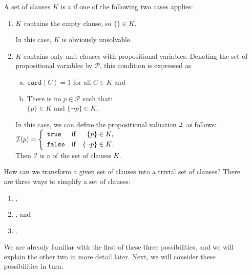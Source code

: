 \begin{Definition}
  A set of clauses $K$ is a  if one of the following two cases applies:
  \begin{enumerate}
  \item $K$ contains the empty clause, so $\{\} \in K$.

        In this case, $K$ is obviously unsolvable.
  \item $K$ contains only unit clauses with \underline{} propositional variables.
        Denoting the set of propositional variables by $\mathcal{P}$,
        this condition is expressed as 
        \begin{enumerate}[(a)]
        \item $\texttt{card}(C) = 1$ \quad for all $C \in K$ \quad and
        \item There is no $p \in \mathcal{P}$ such that: 
              \\[0.2cm]
              \hspace*{1.3cm}
              $\{p\} \in K$ \quad and \quad $\{\neg p\} \in K$.
        \end{enumerate}
        In this case, we can define the propositional valuation $\mathcal{I}$ as follows:
        \\[0.2cm]
        \hspace*{1.3cm}
        $\mathcal{I}(p) = \left\{
                   \begin{array}{lcr}
                     \texttt{true}  & \mbox{if} & \{p\}      \in K, \\[0.1cm]
                     \texttt{false} & \mbox{if} & \{\neg p\} \in K.
                   \end{array}
                 \right.
        $
        \\[0.2cm]
        Then $\mathcal{I}$ is a  of the set of clauses $K$. \eox
  \end{enumerate}
\end{Definition}

How can we transform a given set of clauses into a trivial set of clauses?
There are three ways to simplify a set of clauses:
\begin{enumerate}
\item {},
\item {}, and
\item {}.
\end{enumerate}
We are already familiar with the first of these three
possibilities, and we will explain the other two in more detail later.
Next, we will consider these possibilities in turn.

